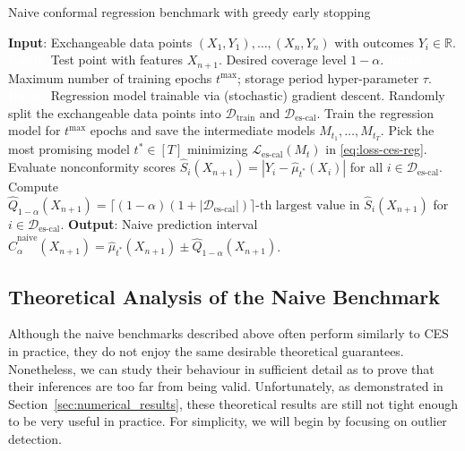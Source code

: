 \begin{algorithm}[H]
    \caption{Naive conformal regression benchmark with greedy early stopping}
    \label{alg:naive-reg}
    \begin{algorithmic}[1]
        \STATE \textbf{Input}: Exchangeable data points $(X_{1},Y_{1}), \ldots, (X_{n},Y_{n})$ with outcomes $Y_i \in \mathbb{R}$.
        \STATE \textcolor{white}{\textbf{Input}:} Test point with features $X_{n+1}$. Desired coverage level $1-\alpha$.
        \STATE \textcolor{white}{\textbf{Input}:} Maximum number of training epochs $t^{\text{max}}$; storage period hyper-parameter $\tau$.
        \STATE \textcolor{white}{\textbf{Input}:} Regression model trainable via (stochastic) gradient descent.
        \STATE Randomly split the exchangeable data points into $\mathcal{D}_{\text{train}}$ and $\mathcal{D}_{\text{es-cal}}$.
        \STATE Train the regression model for $t^{\text{max}}$ epochs and save the intermediate models $M_{t_1} , \dots, M_{t_T}$.
        \STATE Pick the most promising model $t^* \in [T]$ minimizing $\mathcal{L}_{\text{es-cal}}(M_t)$ in \eqref{eq:loss-ces-reg}.
        \STATE Evaluate nonconformity scores $\hat{S}_i(X_{n+1}) = | Y_i - \hat{\mu}_{t^*}(X_{i})|$ for all $i \in \mathcal{D}_{\text{es-cal}}$.
        \STATE Compute $\hat{Q}_{1-\alpha}(X_{n+1}) = \lceil (1-\alpha)(1+|\mathcal{D}_{\text{es-cal}}|) \rceil\text{-th largest value in }
        \hat{S}_i(X_{n+1})$ for $i \in \mathcal{D}_{\text{es-cal}}$.
        \STATE \textbf{Output}: Naive prediction interval $\hat{C}^{\text{naive}}_{\alpha}(X_{n+1}) = \hat{\mu}_{t^*}(X_{n+1}) \pm \hat{Q}_{1-\alpha}(X_{n+1})$.
    \end{algorithmic}
\end{algorithm}




\subsection{Theoretical Analysis of the Naive Benchmark} \label{app:naive-analysis}

Although the naive benchmarks described above often perform similarly to CES in practice, they do not enjoy the same desirable theoretical guarantees.
Nonetheless, we can study their behaviour in sufficient detail as to prove that their inferences are too far from being valid.
Unfortunately, as demonstrated in Section~\ref{sec:numerical_results}, these theoretical results are still not tight enough to be very useful in practice.
For simplicity, we will begin by focusing on outlier detection.


